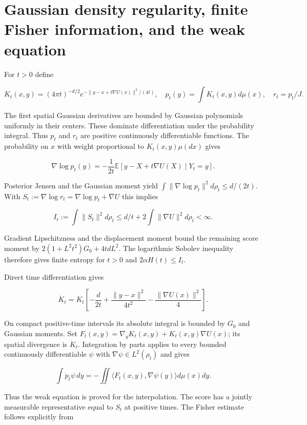 \documentclass[11pt,a4paper]{report}
\begin{document}
\section{\texorpdfstring{Gaussian density regularity, finite Fisher information, and the weak equation}{Gaussian density regularity, finite Fisher information, and the weak equation}}


For \(t>0\) define

\[K_t(x,y)=(4\pi t)^{-d/2}e^{-\|y-x+t\nabla U(x)\|^2/(4t)},\quad
p_t(y)=\int K_t(x,y)d\mu(x),\quad r_t=p_t/J.\]

The first spatial Gaussian derivatives are bounded by Gaussian polynomials uniformly in their centers. These dominate differentiation under the probability integral. Thus \(p_t\) and \(r_t\) are positive continuously differentiable functions. The probability on \(x\) with weight proportional to \(K_t(x,y)\mu(dx)\) gives

\[\nabla\log p_t(y)=-\frac1{2t}\mathbb E[y-X+t\nabla U(X)\mid Y_t=y].\]

Posterior Jensen and the Gaussian moment yield \(\int\|\nabla\log p_t\|^2d\rho_t\le d/(2t)\). With \(S_t:=\nabla\log r_t=\nabla\log p_t+\nabla U\) this implies

\[I_t:=\int\|S_t\|^2d\rho_t\le d/t+2\int\|\nabla U\|^2d\rho_t<\infty.\]

Gradient Lipschitzness and the displacement moment bound the remaining score moment by \(2(1+L^2t^2)G_0+4tdL^2\). The logarithmic Sobolev inequality therefore gives finite entropy for \(t>0\) and \(2\alpha H(t)\le I_t\).



Direct time differentiation gives

\[\dot K_t=K_t\left[-\frac d{2t}+\frac{\|y-x\|^2}{4t^2}-\frac{\|\nabla U(x)\|^2}{4}\right].\]

On compact positive-time intervals its absolute integral is bounded by \(G_0\) and Gaussian moments. Set \(F_t(x,y)=\nabla_y K_t(x,y)+K_t(x,y)\nabla U(x)\); its spatial divergence is \(\dot K_t\). Integration by parts applies to every bounded continuously differentiable \(\psi\) with \(\nabla\psi\in L^2(\rho_t)\) and gives

\[\int\dot p_t\psi\,dy=-\iint\langle F_t(x,y),\nabla\psi(y)\rangle d\mu(x)dy.\]

Thus the weak equation is proved for the interpolation. The score has a jointly measurable representative equal to \(S_t\) at positive times. The Fisher estimate follows explicitly from
\end{document}
